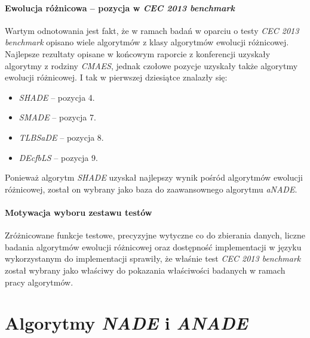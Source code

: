 \documentclass[12pt,a4paper]{report}
\begin{document}
{{{{\subsubsection{Ewolucja różnicowa -- pozycja w \emph{CEC 2013 benchmark}}
\par{
Wartym odnotowania jest fakt, że w ramach badań w oparciu o testy \emph{CEC 2013 benchmark} opisano wiele algorytmów z klasy algorytmów ewolucji różnicowej. Najlepsze rezultaty opisane w końcowym raporcie z konferencji \cite{CEC2013Comp} uzyskały algorytmy z rodziny \emph{CMAES}, jednak czołowe pozycje uzyskały także algorytmy ewolucji różnicowej. I tak w pierwszej dziesiątce znalazły się:
\begin{itemize}
\item \emph{SHADE} \cite{SHADE} -- pozycja 4.
\item \emph{SMADE} \cite{SMADE} -- pozycja 7.
\item \emph{TLBSaDE} \cite{TLBSaDE} -- pozycja 8.
\item \emph{DEcfbLS} \cite{DEcfbLS} -- pozycja 9.
\end{itemize}
}
\par{
Ponieważ algorytm \emph{SHADE} uzyskał najlepszy wynik pośród algorytmów ewolucji różnicowej, został on wybrany jako baza do zaawansownego algorytmu \emph{aNADE}.
}

\subsubsection{Motywacja wyboru zestawu testów}
\par{
Zróżnicowane funkcje testowe, precyzyjne wytyczne co do zbierania danych, liczne badania algorytmów ewolucji różnicowej oraz dostępność implementacji w języku wykorzystanym do implementacji sprawiły, że właśnie test \emph{CEC 2013 benchmark} został wybrany jako właściwy do pokazania właściwości badanych w ramach pracy algorytmów.
}

\chapter{Algorytmy \emph{NADE} i \emph{ANADE}}
}}}}
\end{document}
